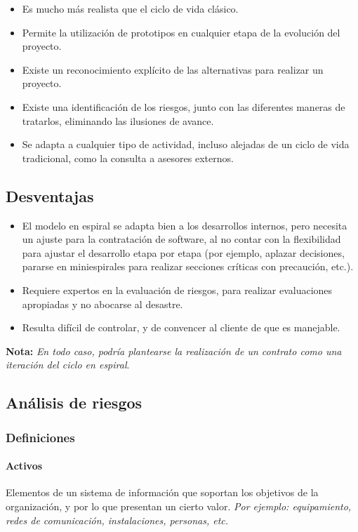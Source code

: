 \begin{itemize}
   \item Es mucho más realista que el ciclo de vida clásico.
   \item Permite la utilización de prototipos en cualquier etapa de la evolución del proyecto.
   \item Existe un reconocimiento explícito de las alternativas para realizar un proyecto.
   \item Existe una identificación de los riesgos, junto con las diferentes maneras de tratarlos, eliminando las ilusiones de avance.
   \item Se adapta a cualquier tipo de actividad, incluso alejadas de un ciclo de vida tradicional, como la consulta a asesores externos.
\end{itemize}


\subsection{Desventajas}
\begin{itemize}
   \item El modelo en espiral se adapta bien a los desarrollos internos, pero necesita un ajuste para la contratación de software, al no contar con la flexibilidad para ajustar el desarrollo etapa por etapa (por ejemplo, aplazar decisiones, pararse en miniespirales para realizar secciones críticas con precaución, etc.).
   \item Requiere expertos en la evaluación de riesgos, para realizar evaluaciones apropiadas y no abocarse al desastre.
   \item Resulta difícil de controlar, y de convencer al cliente de que es manejable.
\end{itemize}

\textbf{Nota:} \textit{En todo caso, podría plantearse la realización de un contrato como una iteración del ciclo en espiral}.


\subsection{Análisis de riesgos}

\subsubsection{Definiciones}

\paragraph{Activos} Elementos de un sistema de información que soportan los objetivos de la organización, y por lo que presentan un cierto valor. \textit{Por ejemplo: equipamiento, redes de comunicación, instalaciones, personas, etc.}

